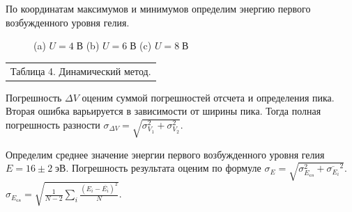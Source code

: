 \documentclass[10pt,a4paper]{article}
\begin{document}
	По координатам максимумов и минимумов определим энергию первого возбужденного уровня гелия.
	
	\begin{figure}
		\centering
		\caption{(a) $U = 4\;$В (b) $U = 6\;$В (c) $U = 8\;$В}
		\label{fig:foobar}
	\end{figure}

	\begin{center}
		\begin{tabular}[t]{c}
			Таблица 4. Динамический метод. \\
			
		\end{tabular}
	\end{center}


	Погрешность $\Delta V$ оценим суммой погрешностей отсчета и определения пика. Вторая ошибка варьируется в зависимости от ширины пика. Тогда полная погрешность разности $\sigma_{\Delta V} = \sqrt{\sigma_{V_1}^2 + \sigma_{V_2}^2}$.
	
	Определим среднее значение энергии первого возбужденного уровня гелия $E = 16 \pm 2 \; эВ$.  Погрешность результата оценим по формуле $\sigma_E = \sqrt{\sigma_{E_{сл}}^2 + \overline{\sigma_{E_i}}^2}$. $\sigma_{E_{сл}} = \sqrt{\frac{1}{N -2 } \sum_i \frac{(E_i - \overline{E_i})^2}{N}}$.
	
\end{document}

